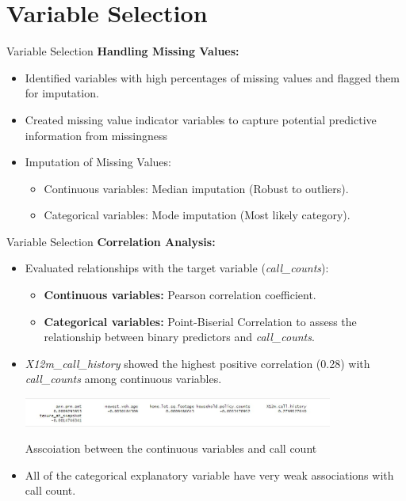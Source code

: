 \documentclass{beamer}\usepackage[]{graphicx}\usepackage[]{xcolor}
\begin{document}
\section{Variable Selection}

\begin{frame}{Variable Selection}
\textbf{Handling Missing Values:}
\begin{itemize}
    \item Identified variables with high percentages of missing values and flagged them for imputation.
    \item Created missing value indicator variables to capture potential predictive information from missingness
    \item Imputation of Missing Values:
    \begin{itemize}
      \item Continuous variables: Median imputation (Robust to outliers).
      \item Categorical variables: Mode imputation (Most likely category).
    \end{itemize}
\end{itemize}
\end{frame}

\begin{frame}{Variable Selection}
\textbf{Correlation Analysis:}
\begin{itemize}
    \item Evaluated relationships with the target variable (\textit{call\_counts}):
    \begin{itemize}
        \item \textbf{Continuous variables:} Pearson correlation coefficient.
        \item \textbf{Categorical variables:} Point-Biserial Correlation to assess the relationship between binary predictors and           \textit{call\_counts}.
    \end{itemize}
    
    \item \textit{X12m\_call\_history} showed the highest positive correlation (0.28) with \textit{call\_counts} among continuous variables.
    \begin{center}
    \includegraphics[width=0.8\textwidth]{AssC.jpg}
    \vspace{0.2cm} %
    
    \footnotesize{Asscoiation between the continuous variables and call count}
\end{center}
    \item All of the categorical explanatory variable have very weak associations with call count.
\end{itemize}

\end{frame}
\end{document}
